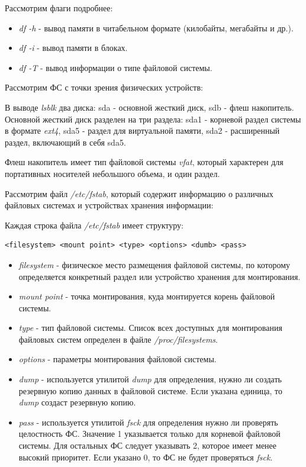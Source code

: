 \documentclass[14pt,a4paper,report]{report}
\begin{document}
Рассмотрим флаги подробнее:

\begin{itemize}
	\item \emph{df -h} - вывод памяти в читабельном формате (килобайты, мегабайты и др.).
	\item \emph{df -i} - вывод памяти в блоках.
	\item \emph{df -T} - вывод информации о типе файловой системы.
\end{itemize}

Рассмотрим ФС с точки зрения физических устройств:



В выводе \emph{lsblk} два диска: sda - основной жесткий диск, sdb - флеш накопитель. Основной жесткий диск разделен на три раздела: sda1 - корневой раздел системы в формате \emph{ext4}, sda5 - раздел для виртуальной памяти, sda2 - расширенный раздел, включающий в себя sda5.

Флеш накопитель имеет тип файловой системы \emph{vfat}, который характерен для портативных носителей небольшого объема, и один раздел.

Рассмотрим файл \emph{/etc/fstab}, который содержит информацию о различных файловых системах и устройствах хранения информации:



Каждая строка файла \emph{/etc/fstab} имеет структуру:

\begin{verbatim}
<filesystem> <mount point> <type> <options> <dumb> <pass> 
\end{verbatim}

\begin{itemize}
	\item \emph{filesystem} - физическое место размещения файловой системы, по которому определяется конкретный раздел или устройство хранения для монтирования.
	\item \emph{mount point} - точка монтирования, куда монтируется корень файловой системы.
	\item \emph{type} - тип файловой системы. Список всех доступных для монтирования файловых систем определен в файле \emph{/proc/filesystems}.
	\item \emph{options} - параметры монтирования файловой системы.
	\item \emph{dump} - используется утилитой \emph{dump} для определения, нужно ли создать резервную копию данных в файловой системе. Если указана единица, то \emph{dump} создаст резервную копию.
	\item \emph{pass} - используется утилитой \emph{fsck} для определения нужно ли проверять целостность ФС. Значение 1 указывается только для корневой файловой системы. Для остальных ФС следует указывать 2, которое имеет менее высокий приоритет. Если указано 0, то ФС не будет проверяться \emph{fsck}.
\end{itemize}
\end{document}
